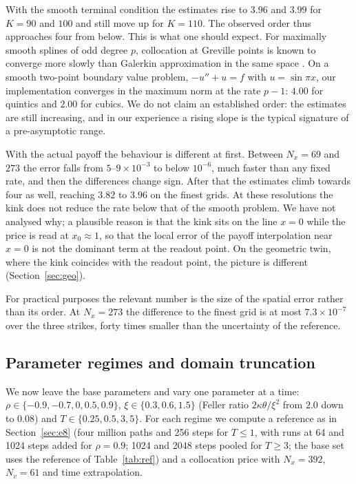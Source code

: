 With the smooth terminal condition the estimates rise to $3.96$ and $3.99$ for $K=90$ and $100$ and still
move up for $K=110$. The observed order thus approaches four from below. This is what one should expect.
For maximally smooth splines of odd degree $p$, collocation at Greville points is known to converge more
slowly than Galerkin approximation in the same space \citep{Auricchio2010,Anitescu2015}. On a smooth
two-point boundary value problem, $-u''+u=f$ with $u=\sin\pi x$, our implementation converges in the
maximum norm at the rate $p-1$: $4.00$ for quintics and $2.00$ for cubics. We do not claim an
established order: the estimates are still increasing, and in our experience a rising slope is the
typical signature of a pre-asymptotic range.

With the actual payoff the behaviour is different at first. Between $N_x=69$ and $273$ the error falls from
$5$--$9\times10^{-3}$ to below $10^{-6}$, much faster than any fixed rate, and then the differences change
sign. After that the estimates climb towards four as well, reaching $3.82$ to $3.96$ on the finest grids.
At these resolutions the kink does not reduce the rate below that of the smooth problem. We have not
analysed why; a plausible reason is that the kink sits on the line $x=0$ while the price is read at
$x_0\approx1$, so that the local error of the payoff interpolation near $x=0$ is not the dominant term at
the readout point. On the geometric twin, where the kink coincides with the readout point, the picture is
different (Section~\ref{sec:geo}).

For practical purposes the relevant number is the size of the spatial error rather than its order. At
$N_x=273$ the difference to the finest grid is at most $7.3\times10^{-7}$ over the three strikes, forty times
smaller than the uncertainty of the reference.

\subsection{Parameter regimes and domain truncation}\label{sec:regimes}

We now leave the base parameters and vary one parameter at a time: $\rho\in\{-0.9,-0.7,0,0.5,0.9\}$,
$\xi\in\{0.3,0.6,1.5\}$ (Feller ratio $2\kappa\theta/\xi^2$ from $2.0$ down to $0.08$) and
$T\in\{0.25,0.5,3,5\}$. For each regime we compute a reference as in Section~\ref{sec:e8} (four million
paths and 256 steps for $T\le1$, with runs at 64 and 1024 steps added for $\rho=0.9$; 1024 and 2048 steps
pooled for $T\ge3$; the base set uses the reference of Table~\ref{tab:ref}) and a collocation price with
$N_x=392$, $N_v=61$ and time extrapolation.

